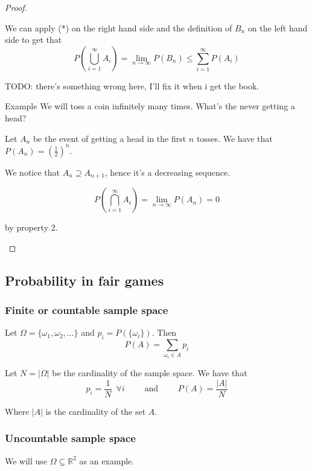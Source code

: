 \documentclass[10pt]{extarticle}
\newcommand{\R}{\mathbb{R}}
\begin{document}
\begin{proof}
\begin{enumerate}
              We can apply (*) on the right hand side and the definition of $B_n$ on the left hand side to get that
              $$
                  P\left(\bigcup_{i=1}^\infty A_i\right) = \lim_{n \to \infty} P(B_n) \le \sum_{i=1}^\infty P(A_i)
              $$

              TODO: there's something wrong here, I'll fix it when i get the book.
    \end{enumerate}

    \begin{examplebox}{Example}
        We will toss a coin infinitely many times. What's the never getting a head?

        Let $A_n$ be the event of getting a head in the first $n$ tosses.
        We have that $P(A_n) = \left(\frac{1}{2}\right)^n$.

        We notice that $A_n \supseteq A_{n+1}$, hence it's a decreasing sequence.

        $$
            P\left(\bigcap_{i=1}^\infty A_i\right) = \lim_{n \to \infty} P(A_n) = 0
        $$

        by property 2.

    \end{examplebox}
\end{proof}

\subsection{Probability in fair games}

\subsubsection{Finite or countable sample space}

Let $\Omega = \{\omega_1, \omega_2, \dots\}$ and $p_i = P(\{\omega_i\})$.
Then
$$
    P(A) = \sum_{\omega_i \in A} p_i
$$

Let $N = |\Omega|$ be the cardinality of the sample space.
We have that
$$
    p_i = \frac{1}{N} \enspace \forall i \qquad \text{ and } \qquad P(A) = \frac{|A|}{N}
$$

Where $|A|$ is the cardinality of the set $A$.

\subsubsection{Uncountable sample space}

We will use $\Omega \subseteq \R^2$ as an example.
\end{document}
